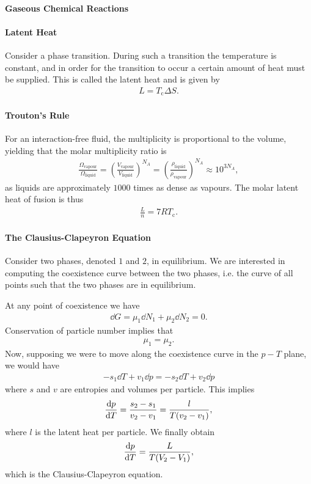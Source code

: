\paragraph{Gaseous Chemical Reactions}

\paragraph{Latent Heat}
Consider a phase transition. During such a transition the temperature is constant, and in order for the transition to occur a certain amount of heat must be supplied. This is called the latent heat and is given by
\begin{align*}
	L = T_{\text{c}}\Delta S.
\end{align*}

\paragraph{Trouton's Rule}
For an interaction-free fluid, the multiplicity is proportional to the volume, yielding that the molar multiplicity ratio is
\begin{align*}
	\frac{\Omega_{\text{vapour}}}{\Omega_{\text{liquid}}} = \left(\frac{V_{\text{vapour}}}{V_{\text{liquid}}}\right)^{N_{A}} = \left(\frac{\rho_{\text{liquid}}}{\rho_{\text{vapour}}}\right)^{N_{A}} \approx 10^{3N_{A}},
\end{align*}
as liquids are approximately $1000$ times as dense as vapours. The molar latent heat of fusion is thus
\begin{align*}
	\frac{L}{n} = 7RT_{\text{c}}.
\end{align*}

\paragraph{The Clausius-Clapeyron Equation}
Consider two phases, denoted $1$ and $2$, in equilibrium. We are interested in computing the coexistence curve between the two phases, i.e. the curve of all points such that the two phases are in equilibrium.

At any point of coexistence we have
\begin{align*}
	\dd{G} = \mu_{1}\dd{N_{1}} + \mu_{2}\dd{N_{2}} = 0.
\end{align*}
Conservation of particle number implies that
\begin{align*}
	\mu_{1} = \mu_{2}.
\end{align*}
Now, supposing we were to move along the coexistence curve in the $p-T$ plane, we would have
\begin{align*}
	-s_{1}\dd{T} + v_{1}\dd{p} = -s_{2}\dd{T} + v_{2}\dd{p}
\end{align*}
where $s$ and $v$ are entropies and volumes per particle. This implies
\begin{align*}
	\dv{p}{T} = \frac{s_{2} - s_{1}}{v_{2} - v_{1}} = \frac{l}{T(v_{2} - v_{1})},
\end{align*}
where $l$ is the latent heat per particle. We finally obtain
\begin{align*}
	\dv{p}{T} = \frac{L}{T(V_{2} - V_{1})},
\end{align*}
which is the Clausius-Clapeyron equation.